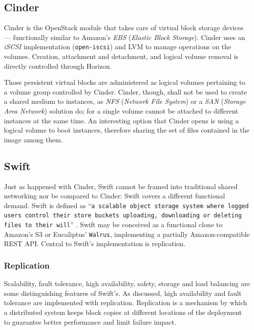 \subsection{Cinder}\label{subsec:cinder}
\noindent Cinder is the OpenStack module that takes care of virtual block storage devices --- functionally similar to Amazon's \emph{EBS} (\emph{Elastic Block Storage}). Cinder uses an \emph{iSCSI} implementation (\texttt{open-iscsi}) and LVM to manage operations on the volumes. Creation, attachment and detachment, and logical volume removal is directly controlled through Horizon.

Those persistent virtual blocks are administered as logical volumes pertaining to a volume group controlled by Cinder. Cinder, though, shall not be used to create a shared medium to instances, as \emph{NFS} (\emph{Network File System}) or a \emph{SAN} (\emph{Storage Area Network}) solution do; for a single volume cannot be attached to different instances at the same time. An interesting option that Cinder opens is using a logical volume to boot instances, therefore sharing the set of files contained in the image among them.

\subsection{Swift}\label{subsec:swift}
\noindent Just as happened with Cinder, Swift cannot be framed into traditional shared networking nor  be compared to Cinder: Swift covers a different functional demand. Swift is defined as ``\texttt{a scalable object storage system where logged users control their store buckets uploading, downloading or deleting files to their will}'' \cite{osswift}. Swift may be conceived as a functional clone to Amazon's S3 or Eucaliptus' \texttt{Walrus}, implementing a partially Amazon-compatible REST API. Central to Swift's implementation is replication.

\subsubsection{Replication}\label{subsubsec:replicacion}
\noindent Scalability, fault tolerance, high availability, safety, storage and load balancing are some distinguishing features of Swift's. As discussed, high availability and fault tolerance are implemented with replication. Replication is a mechanism by which a distributed system keeps block copies at different locations of the deployment to guarantee better performance and limit failure impact.

